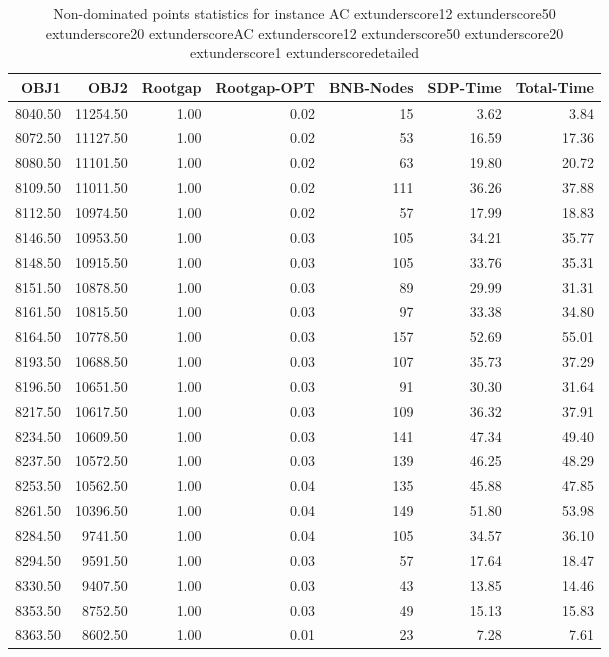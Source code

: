 \begin{table}
\caption{Non-dominated points statistics for instance AC	extunderscore12	extunderscore50	extunderscore20	extunderscoreAC	extunderscore12	extunderscore50	extunderscore20	extunderscore1	extunderscoredetailed}
\label{tab:stats/AC_12_50_20_AC_12_50_20_1_detailed}
\begin{tabular}{rrrrrrr}
\toprule
OBJ1 & OBJ2 & Rootgap & Rootgap-OPT & BNB-Nodes & SDP-Time & Total-Time \\
\midrule
8040.50 & 11254.50 & 1.00 & 0.02 & 15 & 3.62 & 3.84 \\
8072.50 & 11127.50 & 1.00 & 0.02 & 53 & 16.59 & 17.36 \\
8080.50 & 11101.50 & 1.00 & 0.02 & 63 & 19.80 & 20.72 \\
8109.50 & 11011.50 & 1.00 & 0.02 & 111 & 36.26 & 37.88 \\
8112.50 & 10974.50 & 1.00 & 0.02 & 57 & 17.99 & 18.83 \\
8146.50 & 10953.50 & 1.00 & 0.03 & 105 & 34.21 & 35.77 \\
8148.50 & 10915.50 & 1.00 & 0.03 & 105 & 33.76 & 35.31 \\
8151.50 & 10878.50 & 1.00 & 0.03 & 89 & 29.99 & 31.31 \\
8161.50 & 10815.50 & 1.00 & 0.03 & 97 & 33.38 & 34.80 \\
8164.50 & 10778.50 & 1.00 & 0.03 & 157 & 52.69 & 55.01 \\
8193.50 & 10688.50 & 1.00 & 0.03 & 107 & 35.73 & 37.29 \\
8196.50 & 10651.50 & 1.00 & 0.03 & 91 & 30.30 & 31.64 \\
8217.50 & 10617.50 & 1.00 & 0.03 & 109 & 36.32 & 37.91 \\
8234.50 & 10609.50 & 1.00 & 0.03 & 141 & 47.34 & 49.40 \\
8237.50 & 10572.50 & 1.00 & 0.03 & 139 & 46.25 & 48.29 \\
8253.50 & 10562.50 & 1.00 & 0.04 & 135 & 45.88 & 47.85 \\
8261.50 & 10396.50 & 1.00 & 0.04 & 149 & 51.80 & 53.98 \\
8284.50 & 9741.50 & 1.00 & 0.04 & 105 & 34.57 & 36.10 \\
8294.50 & 9591.50 & 1.00 & 0.03 & 57 & 17.64 & 18.47 \\
8330.50 & 9407.50 & 1.00 & 0.03 & 43 & 13.85 & 14.46 \\
8353.50 & 8752.50 & 1.00 & 0.03 & 49 & 15.13 & 15.83 \\
8363.50 & 8602.50 & 1.00 & 0.01 & 23 & 7.28 & 7.61 \\

\end{tabular}
\end{table}
